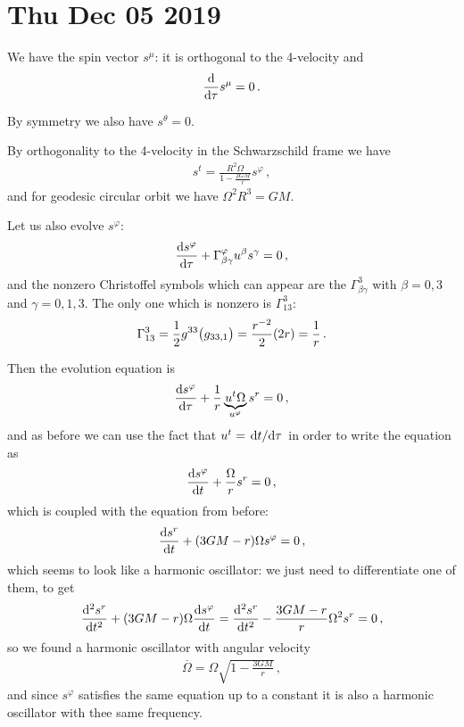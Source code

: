 \documentclass[main.tex]{subfiles}
\begin{document}
\section*{Thu Dec 05 2019}

We have the spin vector \(s^{\mu }\): it is orthogonal to the 4-velocity and 
%
\begin{align}
  \dv{}{\tau } s^{\mu } = 0
\,.
\end{align}

By symmetry we also have \(s^{\theta } =0\). 

By orthogonality to the 4-velocity in the Schwarzschild frame we have 
%
\begin{align}
  s^{t} = \frac{R^2 \Omega }{1 - \frac{2GM}{r}} s^{\varphi }
\,,
\end{align}
%
and for geodesic circular orbit we have \(\Omega^2 R^3 = GM \). 

Let us also evolve \(s^{\varphi }\): 
%
\begin{align}
  \dv{s^{\varphi }}{\tau } + \Gamma^{\varphi }_{\beta \gamma } u^{\beta  } s^{\gamma } = 0
\,,
\end{align}
%
and the nonzero Christoffel symbols which can appear are the \(\Gamma^{3}_{\beta \gamma }\) with \(\beta = 0, 3\) and \(\gamma = 0, 1, 3\). 
The only one which is nonzero is \(\Gamma^{3}_{13}\): 
%
\begin{align}
  \Gamma^{3}_{13} = \frac{1}{2} g^{33} \qty(g_{33, 1})
 = \frac{r^{-2}}{2} \qty(2r) = \frac{1}{r} 
\,.
\end{align}

Then the evolution equation is 
%
\begin{align}
  \dv{s^{\varphi }}{\tau } + \frac{1}{r} \underbrace{u^{t} \Omega}_{ u^{\varphi }} s^{r} = 0  
\,,
\end{align}
%
and as before we can use the fact that \(u^{t} = \dv*{t}{\tau }\) in order to write the equation as 
%
\begin{align}
  \dv{s^{\varphi }}{t} + \frac{\Omega}{r} s^{r} =0 
\,,
\end{align}
%
which is coupled with the equation from before: 
%
\begin{align}
    \dv{s^{r}}{t} + \qty(3GM - r)\Omega s^{\varphi }= 0
\,,
\end{align}
%
which seems to look like a harmonic oscillator: we just need to differentiate one of them, to get 
%
\begin{align}
  \dv[2]{s^{r}}{t} + (3GM-r) \Omega \dv{s^{\varphi }}{t} = \dv[2]{s^{r}}{t} - \frac{3GM-r}{r} \Omega^2 s^{r} = 0
\,,
\end{align}
%
so we found a harmonic oscillator with angular velocity 
%
\begin{align}
  \overline{\Omega} = \Omega \sqrt{1 - \frac{3GM}{r}}
\,,
\end{align}
%
and since \(s^{\varphi }\) satisfies the same equation up to a constant it is also a harmonic oscillator with thee same frequency. 
\end{document}
